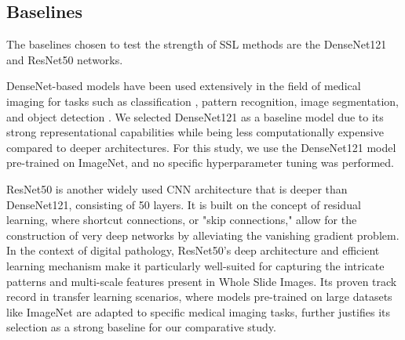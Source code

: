 \documentclass[peerreview]{IEEEtran}
\begin{document}
\subsection{Baselines}
The baselines chosen to test the strength of SSL methods are the DenseNet121\cite{densenet} and ResNet50\cite{resnet} networks. 

DenseNet-based models have been used extensively in the field of medical imaging for tasks such as classification \cite{CHAUHAN2021100020, densetcovid}, pattern recognition, image segmentation, and object detection \cite{densetmedanalysis}. We selected DenseNet121 as a baseline model due to its strong representational capabilities while being less computationally expensive compared to deeper architectures. For this study, we use the DenseNet121 model pre-trained on ImageNet, and no specific hyperparameter tuning was performed. 

ResNet50\cite{resnet} is another widely used CNN architecture that is deeper than DenseNet121, consisting of 50 layers. It is built on the concept of residual learning, where shortcut connections, or "skip connections," allow for the construction of very deep networks by alleviating the vanishing gradient problem. In the context of digital pathology, ResNet50's deep architecture and efficient learning mechanism make it particularly well-suited for capturing the intricate patterns and multi-scale features present in Whole Slide Images. Its proven track record in transfer learning scenarios, where models pre-trained on large datasets like ImageNet are adapted to specific medical imaging tasks, further justifies its selection as a strong baseline for our comparative study\cite{tlsurvey}.
\end{document}
